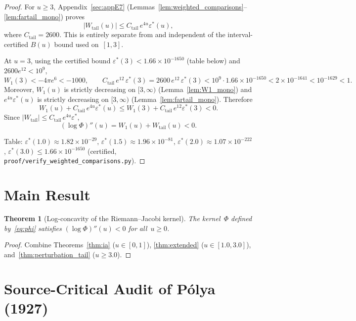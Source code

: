 \documentclass[11pt]{article}
\newtheorem{theorem}{Theorem}
\theoremstyle{definition}
\theoremstyle{remark}
\begin{document}
\begin{proof}
For $u\ge3$, Appendix~\ref{sec:appE7}
(Lemmas~\ref{lem:weighted_comparisons}--\ref{lem:fartail_mono}) proves
\[
|W_{\mathrm{tail}}(u)|\le C_{\mathrm{tail}}\,e^{4u}\varepsilon^*(u),
\]
where $C_{\mathrm{tail}}=2600$.
This is entirely separate from and independent of the interval-certified $B(u)$
bound used on~$[1,3]$.

At $u=3$, using the certified bound
$\varepsilon^*(3) < 1.66\times 10^{-1650}$ (table below) and
$2600e^{12} < 10^9$,
\[
W_1(3)<-4\pi e^6<-1000,\qquad
C_{\mathrm{tail}}\,e^{12}\,\varepsilon^*(3)
= 2600\,e^{12}\,\varepsilon^*(3)
< 10^9 \cdot 1.66\times 10^{-1650}
< 2\times 10^{-1641} < 10^{-1629} < 1.
\]
Moreover, $W_1(u)$ is strictly decreasing on $[3,\infty)$
(Lemma~\ref{lem:W1_mono}) and $e^{4u}\varepsilon^*(u)$ is strictly decreasing on
$[3,\infty)$ (Lemma~\ref{lem:fartail_mono}).
Therefore
\[
W_1(u)+C_{\mathrm{tail}}\,e^{4u}\varepsilon^*(u)
\le
W_1(3)+C_{\mathrm{tail}}\,e^{12}\varepsilon^*(3)<0.
\]
Since $|W_{\mathrm{tail}}|\le C_{\mathrm{tail}}\,e^{4u}\varepsilon^*$,
\[
(\log\Phi)''(u)=W_1(u)+W_{\mathrm{tail}}(u)<0.
\]

Table: $\varepsilon^*(1.0) \approx 1.82\times 10^{-29}$,
$\varepsilon^*(1.5) \approx 1.96\times 10^{-81}$,
$\varepsilon^*(2.0) \approx 1.07\times 10^{-222}$,
$\varepsilon^*(3.0) \leq 1.66\times 10^{-1650}$ (certified,
\texttt{proof/verify\_weighted\_comparisons.py}).
\end{proof}

\section{Main Result}
\label{sec:main}

\begin{theorem}[Log-concavity of the Riemann--Jacobi kernel]\label{thm:main}
The kernel~$\Phi$ defined by~\eqref{eq:phi} satisfies $(\log\Phi)''(u) < 0$
for all~$u \geq 0$.
\end{theorem}

\begin{proof}
Combine Theorems~\ref{thm:ia} ($u \in [0,1]$), \ref{thm:extended} ($u \in [1.0, 3.0]$),
and~\ref{thm:perturbation_tail} ($u \geq 3.0$).
\end{proof}

\section{Source-Critical Audit of P\'{o}lya (1927)}
\label{sec:polya_audit_main}
\end{document}
